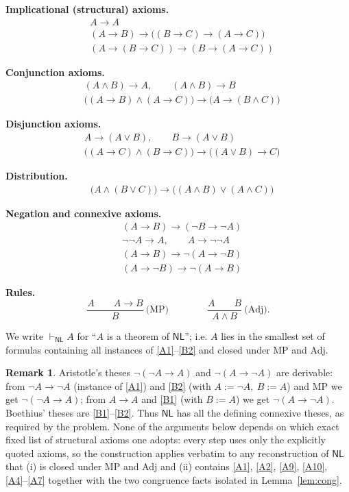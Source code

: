 \documentclass[12pt]{article}
\theoremstyle{definition}
\newtheorem{remark}{Remark}
\newcommand{\NL}{\mathsf{NL}}
\newcommand{\prv}{\vdash_{\NL}}
\newcommand{\imp}{\rightarrow}
\begin{document}
\medskip
\noindent\textbf{Implicational (structural) axioms.}
\begin{align}
&A\imp A \tag{A1}\label{A1}\\
&(A\imp B)\imp\big((B\imp C)\imp(A\imp C)\big) \tag{A2}\label{A2}\\
&(A\imp(B\imp C))\imp(B\imp(A\imp C)) \tag{A3}\label{A3}
\end{align}

\noindent\textbf{Conjunction axioms.}
\begin{align}
&(A\wedge B)\imp A,\qquad (A\wedge B)\imp B \tag{A4}\label{A4}\\
&\big((A\imp B)\wedge(A\imp C)\big)\imp\big(A\imp(B\wedge C)\big) \tag{A5}\label{A5}
\end{align}

\noindent\textbf{Disjunction axioms.}
\begin{align}
&A\imp(A\vee B),\qquad B\imp(A\vee B) \tag{A6}\label{A6}\\
&\big((A\imp C)\wedge(B\imp C)\big)\imp\big((A\vee B)\imp C\big) \tag{A7}\label{A7}
\end{align}

\noindent\textbf{Distribution.}
\begin{align}
&\big(A\wedge(B\vee C)\big)\imp\big((A\wedge B)\vee(A\wedge C)\big) \tag{A8}\label{A8}
\end{align}

\noindent\textbf{Negation and connexive axioms.}
\begin{align}
&(A\imp B)\imp(\neg B\imp\neg A) \tag{A9}\label{A9}\\
&\neg\neg A\imp A,\qquad A\imp\neg\neg A \tag{A10}\label{A10}\\
&(A\imp B)\imp\neg(A\imp\neg B) \tag{B1, Boethius}\label{B1}\\
&(A\imp\neg B)\imp\neg(A\imp B) \tag{B2, Boethius}\label{B2}
\end{align}

\noindent\textbf{Rules.}
\[
\frac{A\qquad A\imp B}{B}\ \text{(MP)} \qquad\qquad
\frac{A\qquad B}{A\wedge B}\ \text{(Adj)} .
\]

We write $\prv A$ for ``$A$ is a theorem of $\NL$''; i.e. $A$ lies in the
smallest set of formulas containing all instances of \eqref{A1}--\eqref{B2} and
closed under MP and Adj.

\begin{remark}
Aristotle's theses $\neg(\neg A\imp A)$ and $\neg(A\imp\neg A)$ are derivable:
from $\neg A\imp\neg A$ (instance of \eqref{A1}) and \eqref{B2}
(with $A:=\neg A,\ B:=A$) and MP we get $\neg(\neg A\imp A)$; from $A\imp A$
and \eqref{B1} (with $B:=A$) we get $\neg(A\imp\neg A)$. Boethius' theses are
\eqref{B1}--\eqref{B2}. Thus $\NL$ has all the defining connexive theses, as
required by the problem. None of the arguments below depends on which exact
fixed list of structural axioms one adopts: every step uses only the explicitly
quoted axioms, so the construction applies verbatim to any reconstruction of
$\NL$ that (i) is closed under MP and Adj and (ii) contains \eqref{A1},
\eqref{A2}, \eqref{A9}, \eqref{A10}, \eqref{A4}--\eqref{A7} together with the
two congruence facts isolated in Lemma~\ref{lem:cong}.
\end{remark}
\end{document}
